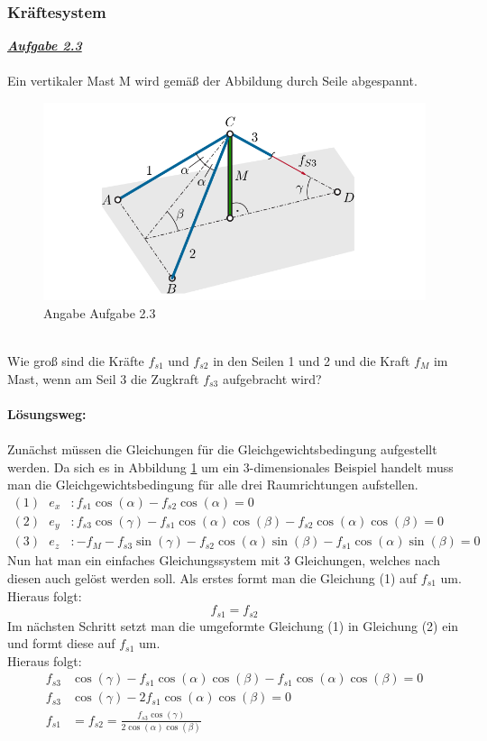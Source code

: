 \documentclass[a4paper,12p]{article}
\begin{document}
\subsubsection{Kräftesystem}
\textbf{\textit{\underline{Aufgabe 2.3}}} \\ \\
Ein vertikaler Mast M wird gemäß der Abbildung durch Seile abgespannt.
\begin{figure}[h]
\begin{center}
\includegraphics[width=12.5cm]{Angabe.png}
\caption{Angabe Aufgabe 2.3}
\label{Angabe}
\end{center}
\end{figure} \\
Wie groß sind die Kräfte $ f_{s1} $ und $ f_{s2} $ in den Seilen 1 und 2 und die Kraft $ f_M $ im Mast, wenn am Seil 3 die Zugkraft $ f_{s3} $ aufgebracht wird? \\ \\
\textbf{Lösungsweg:} \\ \\
Zunächst müssen die Gleichungen für die Gleichgewichtsbedingung aufgestellt werden. Da sich es in Abbildung \ref{Angabe} um ein 3-dimensionales Beispiel handelt muss man die Gleichgewichtsbedingung für alle drei Raumrichtungen aufstellen.
\begin{align*}
	(1) \ \ \ e_x & : f_{s1}\cos(\alpha) - f_{s2}\cos(\alpha) = 0 \\
	(2) \ \ \ e_y & : f_{s3}\cos(\gamma) - f_{s1}\cos(\alpha)\cos(\beta) - f_{s2}\cos(\alpha)\cos(\beta) = 0 \\  
	(3) \ \ \ e_z & : -f_M - f_{s3}\sin(\gamma) - f_{s2}\cos(\alpha)\sin(\beta) - f_{s1}\cos(\alpha)\sin(\beta) = 0
\end{align*}
Nun hat man ein einfaches Gleichungssystem mit 3 Gleichungen, welches nach diesen auch gelöst werden soll. Als erstes formt man die Gleichung (1) auf $f_{s1}$ um. \\ 
Hieraus folgt:
\begin{equation*}
	f_{s1} = f_{s2}
\end{equation*}
Im nächsten Schritt setzt man die umgeformte Gleichung (1) in Gleichung (2) ein und formt diese auf $ f_{s1} $ um. \\
Hieraus folgt:
\begin{align*}
	f_{s3}&\cos(\gamma) - f_{s1}\cos(\alpha)\cos(\beta) - f_{s1}\cos(\alpha)\cos(\beta) = 0 \\
	f_{s3}&\cos(\gamma) - 2f_{s1}\cos(\alpha)\cos(\beta) = 0 \\
	f_{s1}&=f_{s2} = \frac{f_{s3}\cos(\gamma)}{2\cos(\alpha)\cos(\beta)}
\end{align*}
\end{document}
